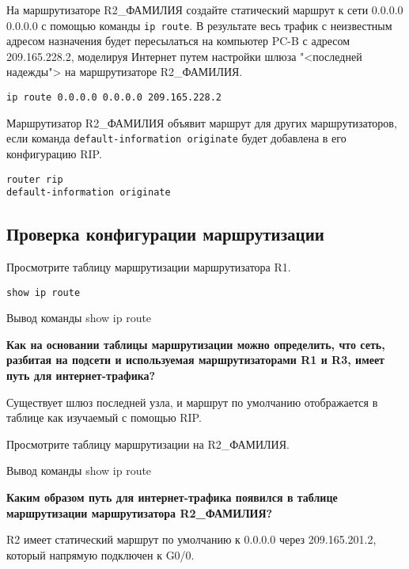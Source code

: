 На маршрутизаторе R2\_ФАМИЛИЯ создайте статический маршрут
к сети 0.0.0.0 0.0.0.0 с помощью команды \texttt{ip route}.
В результате весь трафик с неизвестным адресом назначения будет пересылаться
на компьютер PC-B с адресом 209.165.228.2,
моделируя Интернет путем настройки шлюза "<последней надежды">
на маршрутизаторе R2\_ФАМИЛИЯ.

\begin{verbatim}
ip route 0.0.0.0 0.0.0.0 209.165.228.2
\end{verbatim}

Маршрутизатор R2\_ФАМИЛИЯ объявит маршрут для других маршрутизаторов,
если команда \texttt{default-information originate} будет добавлена
в его конфигурацию RIP.

\begin{verbatim}
router rip
default-information originate
\end{verbatim}

\subsection{Проверка конфигурации маршрутизации}

Просмотрите таблицу маршрутизации маршрутизатора R1.

\begin{verbatim}
show ip route
\end{verbatim}

\begin{image}
    \caption{Вывод команды show ip route}
\end{image}

\textbf{Как на основании таблицы маршрутизации можно определить, что сеть,
    разбитая на подсети и используемая маршрутизаторами R1 и R3,
    имеет путь для интернет-трафика?}

Существует шлюз последней узла,
и маршрут по умолчанию отображается в таблице как изучаемый с помощью RIP.

Просмотрите таблицу маршрутизации на R2\_ФАМИЛИЯ.

\begin{image}
    \caption{Вывод команды show ip route}
\end{image}

\textbf{Каким образом путь для интернет-трафика появился
в таблице маршрутизации маршрутизатора R2\_ФАМИЛИЯ?}

R2 имеет статический маршрут по умолчанию к 0.0.0.0 через 209.165.201.2,
который напрямую подключен к G0/0.

